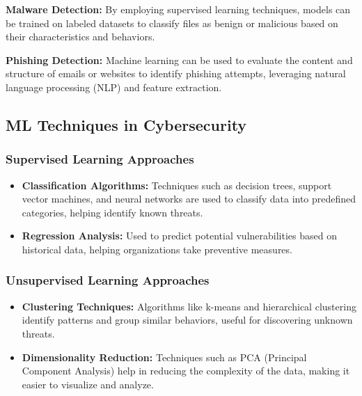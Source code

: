 \documentclass[oneside,a4paper,12pt]{report}
\begin{document}
\vspace*{1\baselineskip}
\newline\textbf{Malware Detection:} By employing supervised learning techniques, models can be trained on labeled datasets to classify files as benign or malicious based on their characteristics and behaviors.

\vspace*{1\baselineskip}
\newline\textbf{Phishing Detection:} Machine learning can be used to evaluate the content and structure of emails or websites to identify phishing attempts, leveraging natural language processing (NLP) and feature extraction.


\subsection{ML Techniques in Cybersecurity}
\subsubsection{Supervised Learning Approaches}
\begin{itemize}
    \item \textbf{Classification Algorithms:} Techniques such as decision trees, support vector machines, and neural networks are used to classify data into predefined categories, helping identify known threats.
    \vspace*{0.3\baselineskip}
    \newline \item \textbf{Regression Analysis:} Used to predict potential vulnerabilities based on historical data, helping organizations take preventive measures.
\end{itemize}

\subsubsection{Unsupervised Learning Approaches}
\begin{itemize}
    \item \textbf{Clustering Techniques:} Algorithms like k-means and hierarchical clustering identify patterns and group similar behaviors, useful for discovering unknown threats.
    \vspace*{0.3\baselineskip}
    \newline \item \textbf{Dimensionality Reduction:} Techniques such as PCA (Principal Component Analysis) help in reducing the complexity of the data, making it easier to visualize and analyze.
\end{itemize}
\end{document}
